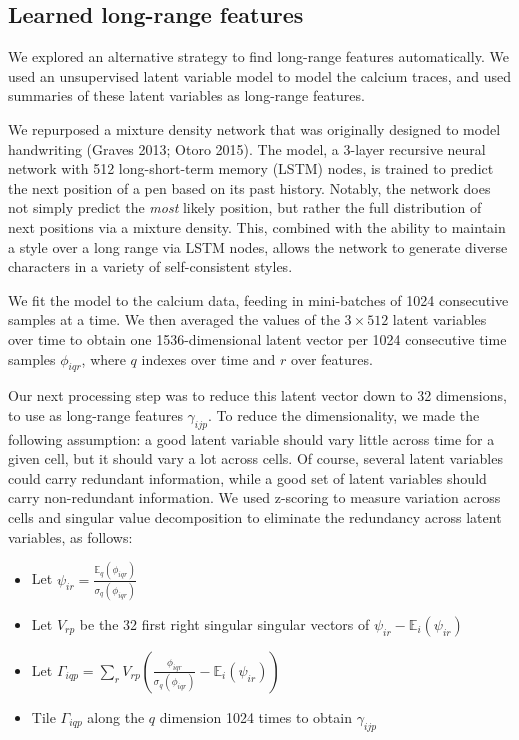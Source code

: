 \documentclass[]{article}
\providecommand{\tightlist}{%
  \setlength{\itemsep}{0pt}\setlength{\parskip}{0pt}}
\begin{document}
\subsection{Learned long-range
features}\label{learned-long-range-features}

We explored an alternative strategy to find long-range features
automatically. We used an unsupervised latent variable model to model
the calcium traces, and used summaries of these latent variables as
long-range features.

We repurposed a mixture density network that was originally designed to
model handwriting (Graves 2013; Otoro 2015). The model, a 3-layer
recursive neural network with 512 long-short-term memory (LSTM) nodes,
is trained to predict the next position of a pen based on its past
history. Notably, the network does not simply predict the \emph{most}
likely position, but rather the full distribution of next positions via
a mixture density. This, combined with the ability to maintain a style
over a long range via LSTM nodes, allows the network to generate diverse
characters in a variety of self-consistent styles.

We fit the model to the calcium data, feeding in mini-batches of 1024
consecutive samples at a time. We then averaged the values of the
\(3 \times 512\) latent variables over time to obtain one
1536-dimensional latent vector per 1024 consecutive time samples
\(\phi_{iqr}\), where \(q\) indexes over time and \(r\) over features.

Our next processing step was to reduce this latent vector down to 32
dimensions, to use as long-range features \(\gamma_{ijp}\). To reduce
the dimensionality, we made the following assumption: a good latent
variable should vary little across time for a given cell, but it should
vary a lot across cells. Of course, several latent variables could carry
redundant information, while a good set of latent variables should carry
non-redundant information. We used z-scoring to measure variation across
cells and singular value decomposition to eliminate the redundancy
across latent variables, as follows:

\begin{itemize}
\tightlist
\item
  Let
  \(\psi_{ir} = \frac{\mathbb{E}_q({\phi}_{iqr})}{\sigma_q({\phi_{iqr}})}\)
\item
  Let \(V_{rp}\) be the 32 first right singular singular vectors of
  \(\psi_{ir} - \mathbb{E}_i(\psi_{ir})\)
\item
  Let
  \(\Gamma_{iqp} = \sum_r V_{rp} \left( \frac{\phi_{iqr}}{\sigma_q({\phi_{iqr}})} - \mathbb{E}_i(\psi_{ir}) \right)\)
\item
  Tile \(\Gamma_{iqp}\) along the \(q\) dimension 1024 times to obtain
  \(\gamma_{ijp}\)
\end{itemize}
\end{document}
